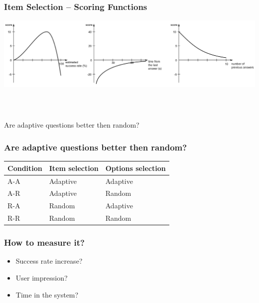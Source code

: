 \documentclass[xcolor=svgnames]{beamer}
\begin{document}
\begin{frame}
	\frametitle{Item Selection – Scoring Functions}
   \includegraphics[width=\textwidth]{img/3functions.png}
\end{frame}
\begin{frame}
  \frametitle{~}
\begin{center} 
\huge{Are adaptive questions better then random?}
\end{center}
\end{frame}
\begin{frame}
  \frametitle{Are adaptive questions better then random?}
\begin{center} 
\begin{table}[tbh]
  \centering
  \begin{tabular}{lll}
    \toprule
    Condition & Item selection & Options selection \\
    \midrule
    A-A & Adaptive & Adaptive \\
    A-R & Adaptive & Random \\
    R-A & Random & Adaptive \\
    R-R & Random & Random \\
    \bottomrule
  \end{tabular}
\end{table}
\end{center}
\end{frame}
\begin{frame}
	\frametitle{How to measure it?}
  \begin{itemize}
    \item Success rate increase?
    \item User impression? 
    \item Time in the system? 
    \
  \end{itemize}
\end{frame}
\end{document}
